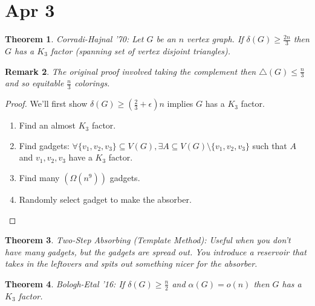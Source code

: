 \documentclass[a4paper]{article}
\newtheorem{thm}{Theorem}[section]
\newtheorem{rmk}[thm]{Remark}
\begin{document}
\section{Apr 3}
\begin{thm}
    Corradi-Hajnal '70: Let $G$ be an $n$ vertex graph. If $\delta(G)\geq \frac{2n}{3}$ then $G$ has a $K_3$ factor (spanning set of vertex disjoint triangles). 
\end{thm}
\begin{rmk}
    The original proof involved taking the complement then $\triangle(G)\leq \frac{n}{3}$ and so equitable $\frac{n}{3}$ colorings. 
\end{rmk}
\begin{proof}
    We'll first show $\delta(G)\geq \left( \frac{2}{3}+\epsilon \right)n$ implies $G$ has a $K_3$ factor.
    \begin{enumerate}
        \item Find an almost $K_3$ factor.
        \item Find gadgets: $\forall \{v_1,v_2,v_3\}\subseteq V(G), \exists A\subseteq V(G)\setminus \{v_1,v_2,v_3\}$ such that $A$ and $v_1,v_2,v_3$ have a $K_3$ factor. 
        \item Find many $(\Omega(n^9))$ gadgets.
        \item Randomly select gadget to make the absorber.
    \end{enumerate}
\end{proof}
\begin{thm}
    Two-Step Absorbing (Template Method): Useful when you don't have many gadgets, but the gadgets are spread out. You introduce a reservoir that takes in the leftovers and spits out something nicer for the absorber. 
\end{thm}
\begin{thm}
    Bologh-Etal '16: If $\delta(G)\geq \frac{n}{2}$ and $\alpha(G)=o(n)$ then $G$ has a $K_3$ factor. 
\end{thm}
\newpage
\end{document}

